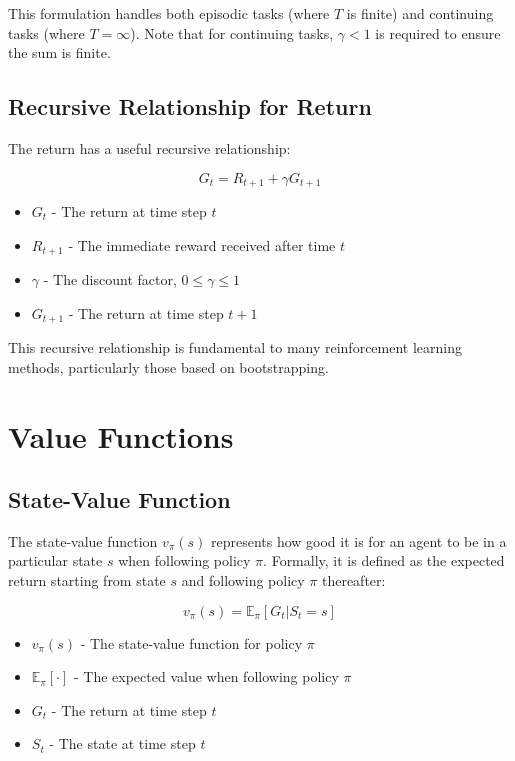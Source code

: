 \documentclass[12pt,a4paper]{article}
\begin{document}
This formulation handles both episodic tasks (where $T$ is finite) and continuing tasks (where $T = \infty$). Note that for continuing tasks, $\gamma < 1$ is required to ensure the sum is finite.

\subsection{Recursive Relationship for Return}

The return has a useful recursive relationship:

\begin{equation}
G_t = R_{t+1} + \gamma G_{t+1}
\end{equation}

\begin{tcolorbox}[title=Notation Overview]
\begin{itemize}
    \item $G_t$ - The return at time step $t$
    \item $R_{t+1}$ - The immediate reward received after time $t$
    \item $\gamma$ - The discount factor, $0 \leq \gamma \leq 1$
    \item $G_{t+1}$ - The return at time step $t+1$
\end{itemize}
\end{tcolorbox}

This recursive relationship is fundamental to many reinforcement learning methods, particularly those based on bootstrapping.

\section{Value Functions}

\subsection{State-Value Function}

The state-value function $v_\pi(s)$ represents how good it is for an agent to be in a particular state $s$ when following policy $\pi$. Formally, it is defined as the expected return starting from state $s$ and following policy $\pi$ thereafter:

\begin{equation}
v_\pi(s) = \mathbb{E}_\pi[G_t | S_t = s]
\end{equation}

\begin{tcolorbox}[title=Notation Overview]
\begin{itemize}
    \item $v_\pi(s)$ - The state-value function for policy $\pi$
    \item $\mathbb{E}_\pi[\cdot]$ - The expected value when following policy $\pi$
    \item $G_t$ - The return at time step $t$
    \item $S_t$ - The state at time step $t$
\end{itemize}
\end{tcolorbox}
\end{document}
